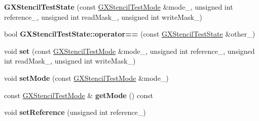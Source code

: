 \begin{DoxyCompactItemize}
\item 
{\bfseries G\+X\+Stencil\+Test\+State} (const \hyperlink{class_i_dream_sky_1_1_g_x_stencil_test_mode}{G\+X\+Stencil\+Test\+Mode} \&mode\+\_\+, unsigned int reference\+\_\+, unsigned int read\+Mask\+\_\+, unsigned int write\+Mask\+\_\+)\hypertarget{class_i_dream_sky_1_1_g_x_stencil_test_state_ab1e776945172ab2d8b117d58836ec69e}{}\label{class_i_dream_sky_1_1_g_x_stencil_test_state_ab1e776945172ab2d8b117d58836ec69e}

\item 
bool {\bfseries G\+X\+Stencil\+Test\+State\+::operator==} (const \hyperlink{class_i_dream_sky_1_1_g_x_stencil_test_state}{G\+X\+Stencil\+Test\+State} \&other\+\_\+)\hypertarget{class_i_dream_sky_1_1_g_x_stencil_test_state_a70fa95001d0600af4639be796ac86a93}{}\label{class_i_dream_sky_1_1_g_x_stencil_test_state_a70fa95001d0600af4639be796ac86a93}

\item 
void {\bfseries set} (const \hyperlink{class_i_dream_sky_1_1_g_x_stencil_test_mode}{G\+X\+Stencil\+Test\+Mode} \&mode\+\_\+, unsigned int reference\+\_\+, unsigned int read\+Mask\+\_\+, unsigned int write\+Mask\+\_\+)\hypertarget{class_i_dream_sky_1_1_g_x_stencil_test_state_ad3bc4c5948ce9b91ce756711a54ca682}{}\label{class_i_dream_sky_1_1_g_x_stencil_test_state_ad3bc4c5948ce9b91ce756711a54ca682}

\item 
void {\bfseries set\+Mode} (const \hyperlink{class_i_dream_sky_1_1_g_x_stencil_test_mode}{G\+X\+Stencil\+Test\+Mode} \&mode\+\_\+)\hypertarget{class_i_dream_sky_1_1_g_x_stencil_test_state_a252a8c287cf95e65a8d65c68ff1964b7}{}\label{class_i_dream_sky_1_1_g_x_stencil_test_state_a252a8c287cf95e65a8d65c68ff1964b7}

\item 
const \hyperlink{class_i_dream_sky_1_1_g_x_stencil_test_mode}{G\+X\+Stencil\+Test\+Mode} \& {\bfseries get\+Mode} () const \hypertarget{class_i_dream_sky_1_1_g_x_stencil_test_state_abca821fa034e80581044b2b2a6306ab4}{}\label{class_i_dream_sky_1_1_g_x_stencil_test_state_abca821fa034e80581044b2b2a6306ab4}

\item 
void {\bfseries set\+Reference} (unsigned int reference\+\_\+)\hypertarget{class_i_dream_sky_1_1_g_x_stencil_test_state_a82f36037d1ad92325686176b894e8974}{}\label{class_i_dream_sky_1_1_g_x_stencil_test_state_a82f36037d1ad92325686176b894e8974}


\end{DoxyCompactItemize}

